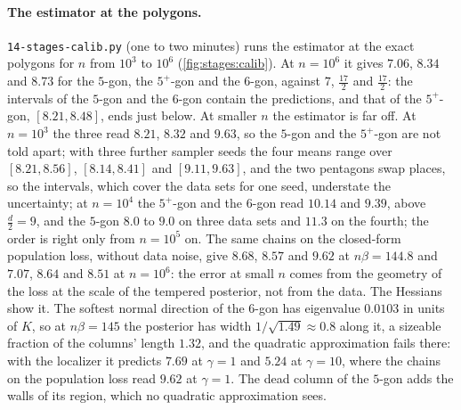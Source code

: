 \begin{refsection}
\paragraph{The estimator at the polygons.} \texttt{14-stages-calib.py} (one to two minutes) runs the estimator at the exact polygons for $n$ from $10^3$ to $10^6$ (\cref{fig:stages:calib}). At $n=10^6$ it gives $7.06$, $8.34$ and $8.73$ for the $5$-gon, the $5^+$-gon and the $6$-gon, against $7$, $\frac{17}2$ and $\frac{17}2$: the intervals of the $5$-gon and the $6$-gon contain the predictions, and that of the $5^+$-gon, $[8.21,8.48]$, ends just below. At smaller $n$ the estimator is far off. At $n=10^3$ the three read $8.21$, $8.32$ and $9.63$, so the $5$-gon and the $5^+$-gon are not told apart; with three further sampler seeds the four means range over $[8.21,8.56]$, $[8.14,8.41]$ and $[9.11,9.63]$, and the two pentagons swap places, so the intervals, which cover the data sets for one seed, understate the uncertainty; at $n=10^4$ the $5^+$-gon and the $6$-gon read $10.14$ and $9.39$, above $\frac d2=9$, and the $5$-gon $8.0$ to $9.0$ on three data sets and $11.3$ on the fourth; the order is right only from $n=10^5$ on. The same chains on the closed-form population loss, without data noise, give $8.68$, $8.57$ and $9.62$ at $n\beta=144.8$ and $7.07$, $8.64$ and $8.51$ at $n=10^6$: the error at small $n$ comes from the geometry of the loss at the scale of the tempered posterior, not from the data. The Hessians show it. The softest normal direction of the $6$-gon has eigenvalue $0.0103$ in units of $K$, so at $n\beta=145$ the posterior has width $1/\sqrt{1.49}\approx0.8$ along it, a sizeable fraction of the columns' length $1.32$, and the quadratic approximation fails there: with the localizer it predicts $7.69$ at $\gamma=1$ and $5.24$ at $\gamma=10$, where the chains on the population loss read $9.62$ at $\gamma=1$. The dead column of the $5$-gon adds the walls of its region, which no quadratic approximation sees.


\end{refsection}
